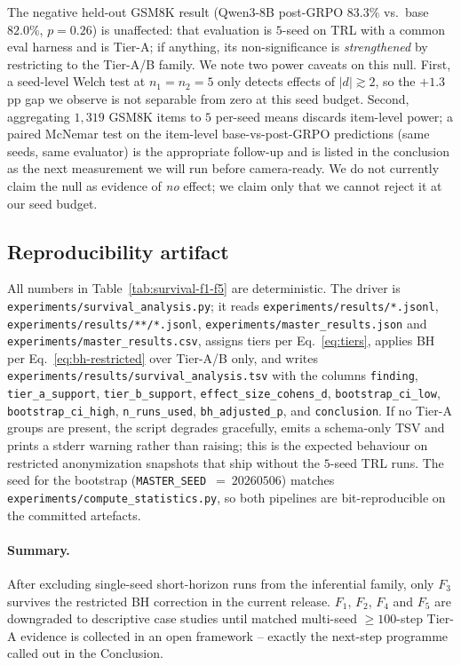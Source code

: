 The negative held-out GSM8K result (Qwen3-8B post-GRPO $83.3\%$ vs.\
base $82.0\%$, $p{=}0.26$) is unaffected: that evaluation is
$5$-seed on TRL with a common eval harness and is Tier-A; if
anything, its non-significance is \emph{strengthened} by restricting
to the Tier-A/B family. We note two power caveats on this null. First,
a seed-level Welch test at $n_1{=}n_2{=}5$ only detects effects of
$|d|\gtrsim 2$, so the $+1.3$\,pp gap we observe is not separable from
zero at this seed budget. Second, aggregating $1{,}319$ GSM8K items to
$5$ per-seed means discards item-level power; a paired McNemar test on
the item-level base-vs-post-GRPO predictions (same seeds, same
evaluator) is the appropriate follow-up and is listed in the conclusion
as the next measurement we will run before camera-ready. We do not
currently claim the null as evidence of \emph{no} effect; we claim
only that we cannot reject it at our seed budget.

\subsection{Reproducibility artifact}
\label{sec:stat-rigor-addendum:repro}

All numbers in Table~\ref{tab:survival-f1-f5} are deterministic.
The driver is
\texttt{experiments/survival\_analysis.py}; it reads
\texttt{experiments/results/*.jsonl},
\texttt{experiments/results/**/*.jsonl},
\texttt{experiments/master\_results.json} and
\texttt{experiments/master\_results.csv}, assigns tiers per
Eq.~\eqref{eq:tiers}, applies BH per Eq.~\eqref{eq:bh-restricted}
over Tier-A/B only, and writes
\texttt{experiments/results/survival\_analysis.tsv} with the
columns \texttt{finding}, \texttt{tier\_a\_support},
\texttt{tier\_b\_support}, \texttt{effect\_size\_cohens\_d},
\texttt{bootstrap\_ci\_low}, \texttt{bootstrap\_ci\_high},
\texttt{n\_runs\_used}, \texttt{bh\_adjusted\_p}, and
\texttt{conclusion}. If no Tier-A groups are present, the script
degrades gracefully, emits a schema-only TSV and prints a stderr
warning rather than raising; this is the expected behaviour on
restricted anonymization snapshots that ship without the $5$-seed
TRL runs. The seed for the bootstrap
(\texttt{MASTER\_SEED}~$=~20260506$) matches
\texttt{experiments/compute\_statistics.py}, so both pipelines are
bit-reproducible on the committed artefacts.

\paragraph{Summary.}
After excluding single-seed short-horizon runs from the inferential
family, only $F_3$ survives the restricted BH correction in the
current release. $F_1$, $F_2$, $F_4$ and $F_5$ are downgraded to
descriptive case studies until matched multi-seed $\ge 100$-step
Tier-A evidence is collected in an open framework -- exactly the
next-step programme called out in the Conclusion.
